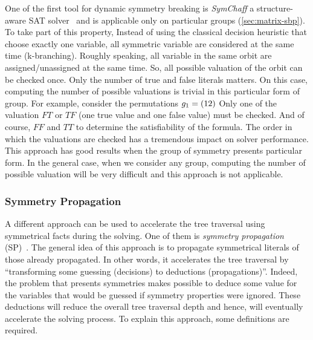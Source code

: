 One of the first tool for dynamic symmetry breaking is \emph{SymChaff} a structure-aware SAT solver~\cite{sabharwal2005symchaff}
and is applicable only on particular groups (\cref{sec:matrix-sbp}).
To take part of this property, Instead of using the classical decision heuristic that choose exactly one
variable, all symmetric variable are considered at the same time (k-branching). 
Roughly speaking,
all variable in the same orbit are assigned/unassigned at the same time. So, all possible valuation 
of the orbit can be checked once. Only the number of true and false literals matters.
On this case, computing the number of possible valuations is trivial in this particular 
form of group. For example, consider the permutations $g_1 = (1\\ 2)$
Only one of the valuation $F T$ or $ T F$ (one true value and one false value) must be checked. And of course,
$F F$ and $T T$ to determine the satisfiability of the formula.
 The order in which the valuations are checked has a tremendous impact on solver performance. 
This approach has good results when the group of symmetry presents particular form.
In the general case, when we consider any group, computing the number of possible valuation will be very difficult and this approach is not applicable.



\subsubsection{Symmetry Propagation}
A different approach can be used to accelerate the tree traversal using symmetrical facts during the solving.
One of them is \emph{symmetry propagation} (SP)~\cite{Devriendt12}.
The general idea of this approach is to propagate symmetrical literals of those already propagated.
In other words, it accelerates the tree traversal by ``transforming some guessing (decisions) to deductions (propagations)''.
Indeed, the problem that presents symmetries makes possible to deduce some value 
for the variables that would be guessed if symmetry properties were ignored.
These deductions will reduce the overall tree traversal depth and hence, will eventually accelerate the solving process. To explain this approach, some definitions are required.

